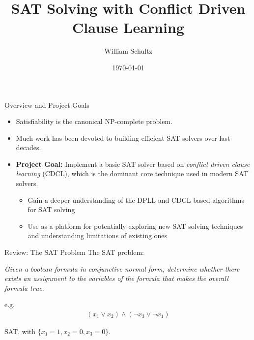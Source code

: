 \documentclass{beamer}
\title{SAT Solving with Conflict Driven Clause Learning}
\author{William Schultz}
\institute{CS 7240 Final Project}
\date{\today}
\begin{document}
\newcommand{\green}[1]{\textcolor{green}{#1}}
\newcommand{\red}[1]{\textcolor{red}{#1}}

\begin{frame}
    \titlepage
\end{frame}

\begin{frame}{Overview and Project Goals}
\begin{itemize}
    \item Satisfiability is the canonical NP-complete problem.
    
    \item Much work has been devoted to building efficient SAT solvers over last decades.\\
    
    \item \textbf{Project Goal:} Implement a basic SAT solver based on \textit{conflict driven clause learning} (CDCL), which is the dominant core technique used in modern SAT solvers.
    \begin{itemize}
        \item Gain a deeper understanding of the DPLL and CDCL based algorithms for SAT solving
        \item Use as a platform for potentially exploring new SAT solving techniques and understanding limitations of existing ones
    \end{itemize}
\end{itemize}
\end{frame}

\begin{frame}{Review: The SAT Problem}
    The SAT problem:
    \vspace{12pt}

    \textit{Given a boolean formula in conjunctive normal form, determine whether there exists an assignment to the variables of the formula that makes the overall formula true.}

    \pause
    \vspace{12pt}
    e.g.
    \begin{align*}
        (x_1 \vee x_2) \wedge (\neg x_3 \vee \neg x_1)
    \end{align*}
    \pause
    \begin{center}
        SAT, with $\{x_1=1,x_2=0,x_3=0\}$. 
    \end{center}
\end{frame}
\end{document}
